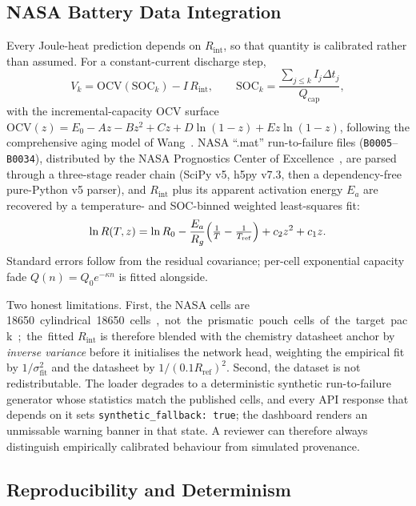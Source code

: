 \documentclass[journal,10pt,compsoc,onecolumn]{IEEEtran}
\begin{document}
\subsection{NASA Battery Data Integration}
\label{sec:details-nasa}

\noindent
Every Joule-heat prediction depends on $R_{\mathrm{int}}$, so that quantity is
calibrated rather than assumed. For a constant-current discharge step,
\begin{equation}
 V_k = \mathrm{OCV}(\mathrm{SOC}_k) - I\,R_{\mathrm{int}},
 \qquad
 \mathrm{SOC}_k = \frac{\sum_{j\le k} I_j \Delta t_j}{Q_{\mathrm{cap}}},
\label{eq:ocv}
\end{equation}
with the incremental-capacity OCV surface
$\mathrm{OCV}(z)=E_0-Az-Bz^2+Cz+D\ln(1-z)+Ez\ln(1-z)$, following the
comprehensive aging model of Wang~\cite{wang2014}. NASA ``.mat'' run-to-failure
files (\texttt{B0005}--\texttt{B0034}), distributed by the NASA Prognostics
Center of Excellence~\cite{nasa_pcoe}, are parsed through a
three-stage reader chain (SciPy v5, h5py v7.3, then a dependency-free
pure-Python v5 parser), and $R_{\mathrm{int}}$ plus its apparent activation
energy $E_a$ are recovered by a temperature- and SOC-binned weighted
least-squares fit:
\begin{equation}
 \ln R(T,z) = \ln R_0 - \frac{E_a}{R_g}\Bigl(\tfrac1T-\tfrac1{T_{\mathrm{ref}}}\Bigr)
             + c_2 z^2 + c_1 z .
\label{eq:calib}
\end{equation}
Standard errors follow from the residual covariance; per-cell exponential
capacity fade $Q(n)=Q_0 e^{-\kappa n}$ is fitted alongside.

\noindent
Two honest limitations. First, the NASA cells are \SI{18650} cylindrical
18650 cells, not the prismatic pouch cells of the target pack; the fitted
$R_{\mathrm{int}}$ is therefore blended with the chemistry datasheet anchor by
\emph{inverse variance} before it initialises the network head, weighting the
empirical fit by $1/\sigma_{\mathrm{fit}}^2$ and the datasheet by
$1/(0.1R_{\mathrm{ref}})^2$. Second, the dataset is not redistributable. The
loader degrades to a deterministic synthetic run-to-failure generator whose
statistics match the published cells, and every API response that depends on it
sets \texttt{synthetic\_fallback: true}; the dashboard renders an unmissable
warning banner in that state. A reviewer can therefore always distinguish
empirically calibrated behaviour from simulated provenance.

\subsection{Reproducibility and Determinism}
\label{sec:details-repro}
\end{document}
